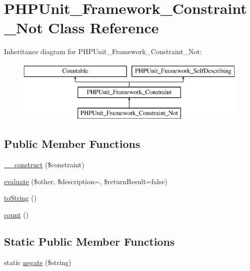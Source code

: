 \hypertarget{class_p_h_p_unit___framework___constraint___not}{}\section{P\+H\+P\+Unit\+\_\+\+Framework\+\_\+\+Constraint\+\_\+\+Not Class Reference}
\label{class_p_h_p_unit___framework___constraint___not}
Inheritance diagram for P\+H\+P\+Unit\+\_\+\+Framework\+\_\+\+Constraint\+\_\+\+Not\+:\begin{figure}[H]
\begin{center}
\leavevmode
\includegraphics[height=3.000000cm]{class_p_h_p_unit___framework___constraint___not}
\end{center}
\end{figure}
\subsection*{Public Member Functions}
\begin{DoxyCompactItemize}
\item 
\mbox{\hyperlink{class_p_h_p_unit___framework___constraint___not_a6e8cb639ef35c3654e8528d5a5c927e6}{\+\_\+\+\_\+construct}} (\$constraint)
\item 
\mbox{\hyperlink{class_p_h_p_unit___framework___constraint___not_a4c184790087f7d42c3daf0d0180fe5fb}{evaluate}} (\$other, \$description=\textquotesingle{}\textquotesingle{}, \$return\+Result=false)
\item 
\mbox{\hyperlink{class_p_h_p_unit___framework___constraint___not_a5558c5d549f41597377fa1ea8a1cefa3}{to\+String}} ()
\item 
\mbox{\hyperlink{class_p_h_p_unit___framework___constraint___not_ac751e87b3d4c4bf2feb03bee8b092755}{count}} ()
\end{DoxyCompactItemize}
\subsection*{Static Public Member Functions}
\begin{DoxyCompactItemize}
\item 
static \mbox{\hyperlink{class_p_h_p_unit___framework___constraint___not_a84a52f4391a4209eb78cba8f8a94d7e1}{negate}} (\$string)
\end{DoxyCompactItemize}
